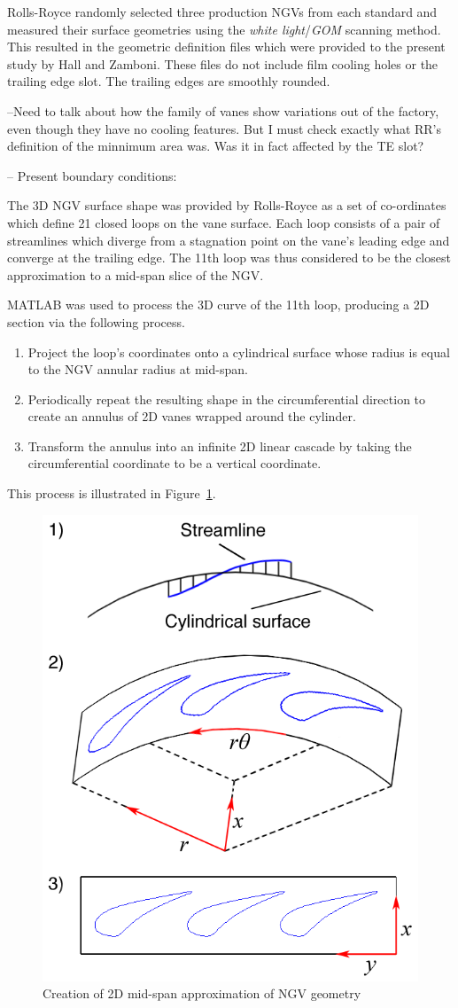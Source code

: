 \documentclass[a4paper, 11pt, twoside]{report}
\begin{document}
Rolls-Royce randomly selected three production NGVs from each standard and measured their surface geometries using the \textit{white light}/\textit{GOM} scanning method. This resulted in the geometric definition files which were provided to the present study by Hall and Zamboni. These files do not include film cooling holes or the trailing edge slot. The trailing edges are smoothly rounded.

--Need to talk about how the family of vanes show variations out of the factory, even though they have no cooling features. But I must check exactly what RR's definition of the minnimum area was. Was it in fact affected by the TE slot?

-- Present boundary conditions:

The 3D NGV surface shape was provided by Rolls-Royce as a set of co-ordinates which define 21 closed loops on the vane surface. Each loop consists of a pair of streamlines which diverge from a stagnation point on the vane's leading edge and converge at the trailing edge. The 11th loop was thus considered to be the closest approximation to a mid-span slice of the NGV.

MATLAB was used to process the 3D curve of the 11th loop, producing a 2D section via the following process. 
\begin{enumerate}
  \item Project the loop's coordinates onto a cylindrical surface whose radius is equal to the NGV annular radius at mid-span.
  \item Periodically repeat the resulting shape in the circumferential direction to create an annulus of 2D vanes wrapped around the cylinder.
  \item Transform the annulus into an infinite 2D linear cascade by taking the circumferential coordinate to be a vertical coordinate.
\end{enumerate}
This process is illustrated in Figure~\ref{fig:2d_geometry_creation}.

\begin{figure}[H]
	\centering
	\includegraphics[width=.6\textwidth]{figs/2d_geometry_creation.png}
	\caption{Creation of 2D mid-span approximation of NGV geometry}
	\label{fig:2d_geometry_creation}
\end{figure}
\end{document}
